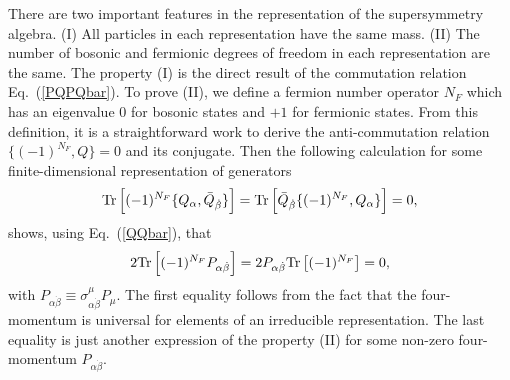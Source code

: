 \documentclass[12pt,twoside,book]{article}
\begin{document}
There are two important features in the representation of the supersymmetry algebra.
(I) All particles in each representation have the same mass.
(II) The number of bosonic and fermionic degrees of freedom in each representation are the same.
The property (I) is the direct result of the commutation relation Eq.\ (\ref{PQPQbar}).
To prove (II), we define a fermion number operator $N_F$ which has an eigenvalue $0$ for bosonic states and $+1$ for fermionic states.
From this definition, it is a straightforward work to derive the anti-commutation relation $\{(-1)^{N_F},Q\}=0$ and its conjugate.
Then the following calculation for some finite-dimensional representation of generators
\begin{align}
  {\rm Tr} \left[ (-1)^{N_F} \{Q_\alpha, \bar{Q}_{\dot{\beta}}\} \right]
  = {\rm Tr} \left[ \bar{Q}_{\dot{\beta}} \{ (-1)^{N_F}, Q_\alpha \} \right] = 0,
\end{align}
shows, using Eq.\ (\ref{QQbar}), that
\begin{align}
  2{\rm Tr} \left[ (-1)^{N_F} P_{\alpha \dot{\beta}} \right]
  = 2P_{\alpha \dot{\beta}} {\rm Tr} \left[(-1)^{N_F} \right] = 0,
\end{align}
with $P_{\alpha \dot{\beta}} \equiv \sigma^\mu_{\alpha \dot{\beta}} P_\mu$.
The first equality follows from the fact that the four-momentum is universal for elements of an irreducible representation.
The last equality is just another expression of the property (II) for some non-zero four-momentum $P_{\alpha \dot{\beta}}$.
\end{document}
